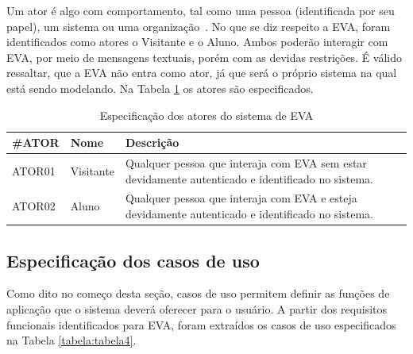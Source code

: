 Um ator é algo com comportamento, tal como uma pessoa (identificada por seu papel), um sistema ou uma organização~\cite{CraigLarman}. No que se diz respeito a EVA, foram identificados como atores o Visitante e o Aluno. Ambos poderão interagir com EVA, por meio de mensagens textuais, porém com as devidas restrições. É válido ressaltar, que a EVA não entra como ator, já que será o próprio sistema na qual está sendo modelando. Na Tabela \ref{tabela:tabela3} os atores são especificados.

\begin{table}[htb!]
\caption{Especificação dos atores do sistema de EVA}
\label{tabela:tabela3}
\center
\footnotesize
\begin{tabular}{|p{2cm}|p{3cm}|p{7.5cm}|}
  \hline
   \textbf{\#ATOR} & \textbf{Nome}  & \textbf{Descrição}  \\
   \hline
    ATOR01 & Visitante & Qualquer pessoa que interaja com EVA sem estar devidamente autenticado e identificado no sistema. \\
   \hline
    ATOR02 & Aluno & Qualquer pessoa que interaja com EVA e esteja devidamente autenticado e identificado no sistema. \\
   \hline
\end{tabular}
\end{table}


\subsection{Especificação dos casos de uso}

Como dito no começo desta seção, casos de uso permitem definir as funções de aplicação que o sistema deverá oferecer para o usuário. A partir dos requisitos funcionais identificados para EVA, foram extraídos os casos de uso especificados na Tabela \ref{tabela:tabela4}.

